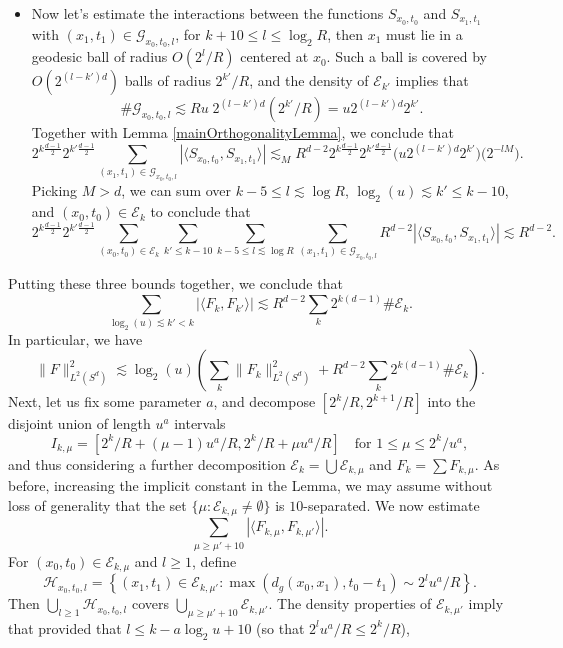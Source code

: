 \documentclass[dvipsnames,letterpaper,12pt]{article}
\begin{document}
\begin{itemize}
    \item Now let's estimate the interactions between the functions ${S\!}_{x_0,t_0}$ and ${S\!}_{x_1,t_1}$ with $(x_1,t_1) \in \mathcal{G}_{x_0,t_0,l}$, for $k + 10 \leq l \leq \log_2 R$, then $x_1$ must lie in a geodesic ball of radius $O(2^l/R)$ centered at $x_0$. Such a ball is covered by $O( 2^{(l-k')d} )$ balls of radius $2^{k'}/R$, and the density of $\mathcal{E}_{k'}$ implies that
    \[ \# \mathcal{G}_{x_0,t_0,l} \lesssim Ru\; 2^{(l-k')d} (2^{k'}/R) = u 2^{(l-k')d} 2^{k'}. \]
    Together with Lemma \ref{mainOrthogonalityLemma}, we conclude that
    \[ 2^{k \frac{d-1}{2}} 2^{k' \frac{d-1}{2}} \sum_{(x_1,t_1) \in \mathcal{G}_{x_0,t_0,l}} |\langle {S\!}_{x_0,t_0}, {S\!}_{x_1,t_1} \rangle| \lesssim_M R^{d-2} 2^{k \frac{d-1}{2}} 2^{k' \frac{d-1}{2}} \Big( u 2^{(l-k')d} 2^{k'} \Big) \Big( 2^{-lM} \Big). \]
    Picking $M > d$, we can sum over $k - 5 \leq l \lesssim \log R$, $\log_2(u) \lesssim k' \leq k - 10$, and $(x_0,t_0) \in \mathcal{E}_k$ to conclude that
    \[ 2^{k \frac{d-1}{2}} 2^{k' \frac{d-1}{2}} \sum_{(x_0,t_0) \in \mathcal{E}_k} \sum_{k' \leq k - 10} \sum_{k-5 \leq l \lesssim \log R} \sum_{(x_1,t_1) \in \mathcal{G}_{x_0,t_0,l}} R^{d-2} |\langle {S\!}_{x_0,t_0}, {S\!}_{x_1,t_1} \rangle| \lesssim R^{d-2}. \]
\end{itemize}
%
Putting these three bounds together, we conclude that
%
\[ \sum_{\log_2(u) \lesssim k' < k} |\langle F_k, F_{k'} \rangle| \lesssim R^{d-2} \sum_k 2^{k (d-1)} \# \mathcal{E}_k. \]
%
In particular, we have
%
\[ \| F \|_{L^2(S^d)}^2 \lesssim \log_2(u) \left( \sum_k \| F_k \|_{L^2(S^d)}^2 + R^{d-2} \sum_k 2^{k (d-1)} \# \mathcal{E}_k \right). \]
%
Next, let us fix some parameter $a$, and decompose $[2^k/R, 2^{k+1}/R]$ into the disjoint union of length $u^a$ intervals
%
\[ I_{k,\mu} = [ 2^k / R + (\mu - 1) u^a / R, 2^k / R + \mu u^a / R] \quad\text{for $1 \leq \mu \leq 2^k/u^a$}, \]
%
and thus considering a further decomposition $\mathcal{E}_k = \bigcup \mathcal{E}_{k,\mu}$ and $F_k = \sum F_{k,\mu}$. As before, increasing the implicit constant in the Lemma, we may assume without loss of generality that the set $\{ \mu: \mathcal{E}_{k,\mu} \neq \emptyset \}$ is $10$-separated. We now estimate
%
\[ \sum_{\mu \geq \mu' + 10} |\langle F_{k,\mu}, F_{k,\mu'} \rangle|. \]
%
For $(x_0,t_0) \in \mathcal{E}_{k,\mu}$ and $l \geq 1$, define
%
\[ \mathcal{H}_{x_0,t_0,l} = \left\{ (x_1,t_1) \in \mathcal{E}_{k,\mu'} : \max(d_g(x_0,x_1), t_0 - t_1) \sim 2^l u^a / R \right\}. \]
%
Then $\bigcup_{l \geq 1} \mathcal{H}_{x_0,t_0,l}$ covers $\bigcup_{\mu \geq \mu' + 10} \mathcal{E}_{k,\mu'}$. The density properties of $\mathcal{E}_{k,\mu'}$ imply that provided that $l \leq k - a \log_2 u + 10$ (so that $2^l u^a / R \leq 2^k / R$),
\end{document}
